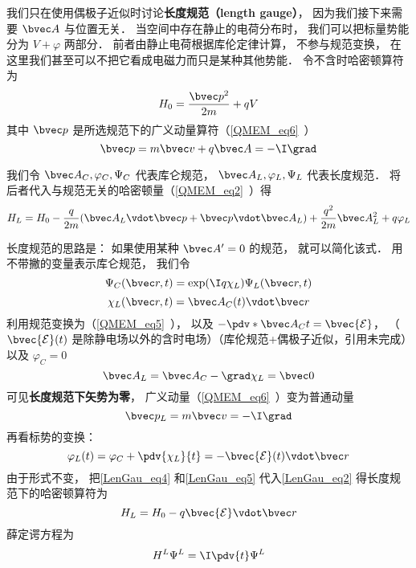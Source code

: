 
\begin{issues}
\issueTODO
\end{issues}


我们只在使用偶极子近似时讨论\textbf{长度规范（length gauge）}， 因为我们接下来需要 $\bvec A$ 与位置无关． 当空间中存在静止的电荷分布时， 我们可以把标量势能分为 $V + \varphi$ 两部分． 前者由静止电荷根据库伦定律计算， 不参与规范变换， 在这里我们甚至可以不把它看成电磁力而只是某种其他势能． 令不含时哈密顿算符为
\begin{equation}
H_0 = \frac{\bvec p^2}{2m} + qV
\end{equation}
其中 $\bvec p$ 是所选规范下的广义动量算符（\autoref{QMEM_eq6}~）
\begin{equation}
\bvec p = m \bvec v + q\bvec A = -\I \grad
\end{equation}

我们令 $\bvec A_C, \varphi_C, \Psi_C$ 代表库仑规范， $\bvec A_L, \varphi_L, \Psi_L$ 代表长度规范． 将后者代入与规范无关的哈密顿量（\autoref{QMEM_eq2}~）得
\begin{equation}\label{LenGau_eq2}
H_L = H_0 - \frac{q}{2m} (\bvec A_L \vdot \bvec p + \bvec p \vdot \bvec A_L)
+ \frac{q^2}{2m} \bvec A_L^2 + q \varphi_L
\end{equation}


长度规范的思路是： 如果使用某种 $\bvec A' = 0$ 的规范， 就可以简化该式． 用不带撇的变量表示库仑规范， 我们令
\begin{equation}\label{LenGau_eq1}
\Psi_C(\bvec r, t) = \exp(\I q\chi_L)\Psi_L(\bvec r, t)
\end{equation}
\begin{equation}
\chi_L(\bvec r, t) = \bvec A_C(t) \vdot \bvec r
\end{equation}
利用规范变换为（\autoref{QMEM_eq5}~）， 以及 $-\pdv*{\bvec A_C}{t} = \bvec {\mathcal E}$， （$\bvec {\mathcal E}(t)$ 是除静电场以外的含时电场）（库伦规范+偶极子近似，引用未完成）以及 $\varphi_C = 0$
\begin{equation}\label{LenGau_eq4}
\bvec A_L = \bvec A_C - \grad \chi_L = \bvec 0
\end{equation}
可见\textbf{长度规范下矢势为零}， 广义动量（\autoref{QMEM_eq6}~）变为普通动量
\begin{equation}
\bvec p_L = m \bvec v = -\I \grad
\end{equation}
再看标势的变换：
\begin{equation}\label{LenGau_eq5}
\varphi_L(t) = \varphi_C + \pdv{\chi_L}{t} = -\bvec {\mathcal E}(t) \vdot \bvec r
\end{equation}
由于形式不变， 把\autoref{LenGau_eq4} 和\autoref{LenGau_eq5} 代入\autoref{LenGau_eq2} 得长度规范下的哈密顿算符为
\begin{equation}
H_L = H_0 - q\bvec{\mathcal{E}} \vdot \bvec r
\end{equation}
薛定谔方程为
\begin{equation}
H^L \Psi^L = \I \pdv{t} \Psi^L
\end{equation}
